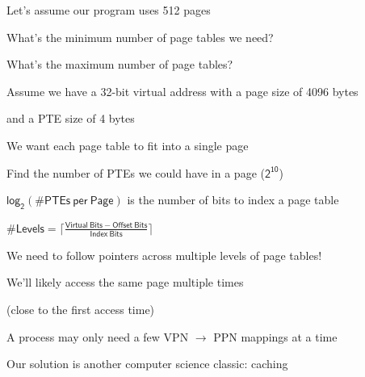   \begin{slide}
    

    Let's assume our program uses 512 pages
    \medskip

    What's the minimum number of page tables we need?
    \medskip

    What's the maximum number of page tables?

  \end{slide}

  \begin{slide}


    Assume we have a 32-bit virtual address with a page size of 4096 bytes

    \leftspace{}and a PTE size of 4 bytes
    \medskip

    We want each page table to fit into a single page

    \leftspace{}Find the number of PTEs we could have in a page ($\mathsf{2^{10}}$)

    \leftspace{}\leftspace{}$\mathsf{log_2(\# PTEs\ per\ Page)}$ is the number of bits to index a page table
    \medskip

    $\mathsf{\# Levels = \lceil \frac{Virtual\ Bits - Offset\ Bits}{Index\ Bits} \rceil}$
    \medskip


  \end{slide}

  \begin{slide}


    We need to follow pointers across multiple levels of page tables!
    \medskip

    We'll likely access the same page multiple times
    
    (close to the first access time)
    \medskip

    A process may only need a few VPN $\rightarrow$ PPN mappings at a time
    \medskip

    Our solution is another computer science classic: caching

  \end{slide}

